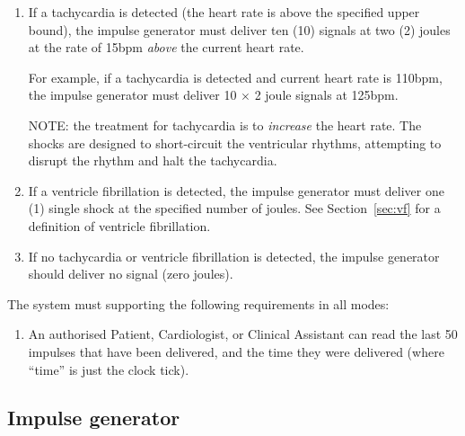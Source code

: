 \documentclass[11pt]{article}
\begin{document}
\begin{enumerate}[~~\bf{R3}.1]



 \item If a tachycardia is detected (the heart rate is above the specified upper bound), the impulse generator must deliver ten (10) signals at two (2) joules at the rate of 15bpm \emph{above} the current heart rate.

  For example, if a tachycardia is detected and current heart rate is 110bpm, the impulse generator must deliver 10 $\times$ 2 joule signals at 125bpm.

 NOTE: the treatment for tachycardia is to \emph{increase} the heart rate. The shocks are designed to short-circuit the ventricular rhythms, attempting to disrupt the rhythm and halt the tachycardia.

 \item If a ventricle fibrillation is detected, the impulse generator must deliver one (1) single shock at the specified number of joules. See Section~\ref{sec:vf} for a definition of ventricle fibrillation.

 \item If no tachycardia or ventricle fibrillation is detected, the impulse generator should deliver no signal (zero joules).

\end{enumerate}

The system must supporting the following requirements in all modes:

\begin{enumerate}[~~\bf{R3}.4]

 \item An authorised Patient, Cardiologist, or Clinical Assistant can read the last 50 impulses that have been delivered, and the time they were delivered (where ``time'' is just the clock tick).

\end{enumerate}


\subsection{Impulse generator}
\end{document}
